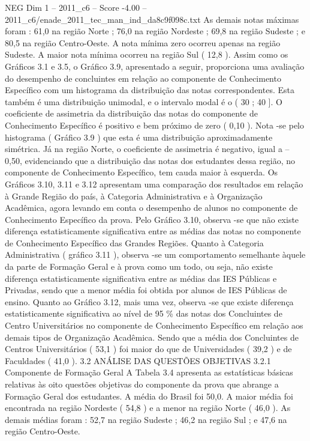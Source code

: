\begin{textsample}{NEG Dim 1 – 2011\_c6 – Score -4.00 – 2011\_c6/enade\_2011\_tec\_man\_ind\_da8c9f098c.txt}
As demais notas máximas foram : 61,0 na região Norte ; 76,0 na região Nordeste ; 69,8 na região Sudeste ; e 80,5 na região Centro-Oeste.
A nota mínima zero ocorreu apenas na região Sudeste.
A maior nota mínima ocorreu na região Sul ( 12,8 ).
Assim como os Gráficos 3.1 e 3.5, o Gráfico 3.9, apresentado a seguir, proporciona uma avaliação do desempenho de concluintes em relação ao componente de Conhecimento Específico com um histograma da distribuição das notas correspondentes.
Esta também é uma distribuição unimodal, e o intervalo modal é o ( 30 ; 40 ].
O coeficiente de assimetria da distribuição das notas do componente de Conhecimento Específico é positivo e bem próximo de zero ( 0,10 ).
Nota -se pelo histograma ( Gráfico 3.9 ) que esta é uma distribuição aproximadamente simétrica.
Já na região Norte, o coeficiente de assimetria é negativo, igual a – 0,50, evidenciando que a distribuição das notas dos estudantes dessa região, no componente de Conhecimento Específico, tem cauda maior à esquerda.
Os Gráficos 3.10, 3.11 e 3.12 apresentam uma comparação dos resultados em relação à Grande Região do país, à Categoria Administrativa e à Organização Acadêmica, agora levando em conta o desempenho de alunos no componente de Conhecimento Específico da prova.
Pelo Gráfico 3.10, observa -se que não existe diferença estatisticamente significativa entre as médias das notas no componente de Conhecimento Específico das Grandes Regiões.
Quanto à Categoria Administrativa ( gráfico 3.11 ), observa -se um comportamento semelhante àquele da parte de Formação Geral e à prova como um todo, ou seja, não existe diferença estatisticamente significativa entre as médias das IES Públicas e Privadas, sendo que a menor média foi obtida por alunos de IES Públicas de ensino.
Quanto ao Gráfico 3.12, mais uma vez, observa -se que existe diferença estatisticamente significativa ao nível de 95 \% das notas dos Concluintes de Centro Universitários no componente de Conhecimento Específico em relação aos demais tipos de Organização Acadêmica.
Sendo que a média dos Concluintes de Centros Universitários ( 53,1 ) foi maior do que de Universidades ( 39,2 ) e de Faculdades ( 41,0 ). 3.2 ANÁLISE DAS QUESTÕES OBJETIVAS 3.2.1 Componente de Formação Geral A Tabela 3.4 apresenta as estatísticas básicas relativas às oito questões objetivas do componente da prova que abrange a Formação Geral dos estudantes.
A média do Brasil foi 50,0.
A maior média foi encontrada na região Nordeste ( 54,8 ) e a menor na região Norte ( 46,0 ).
As demais médias foram : 52,7 na região Sudeste ; 46,2 na região Sul ; e 47,6 na região Centro-Oeste.

\end{textsample}

